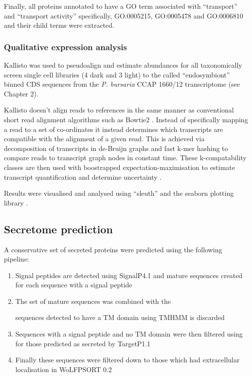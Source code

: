 {{Finally, all proteins annotated to have a GO term associated with ``transport'' and
``transport activity'' specifically, GO:0005215, GO:0005478 and GO:0006810 and their child
terms were extracted.  

\subsubsection{Qualitative expression analysis}

Kallisto \citep{Bray2015} was used to pseudoalign and estimate abundances for 
all taxonomically screen single cell 
libraries (4 dark and 3 light) to the called ``endosymbiont''
binned CDS sequences from the \textit{P. bursaria} CCAP 1660/12
transcriptome (see Chapter 2).

Kallisto doesn't align reads to references in the same
manner as conventional short read alignment algorithms
such as Bowtie2 \citep{Langmead2012}.  Instead of specifically 
mapping a read to a set of co-ordinates it instead
determines which transcripts are compatible with the alignment 
of a given read.  This is achieved via decomposition of transcripts
in de-Bruijn graphs and fast k-mer hashing to compare reads to transcript
graph nodes in constant time.  These k-compatability classes are then used with
boostrapped expectation-maximisation to estimate transcript quantification and
determine uncertainty \citep{Bray2015}. 

Results were visualised and analysed using ``sleuth'' and the
seaborn plotting library \citep{michael_waskom_2015_19108}.

\subsection{Secretome prediction}

A conservative set of secreted proteins were predicted 
using the following pipeline:
\begin{enumerate}
    \item Signal peptides are detected using SignalP4.1 and mature sequences
        created for each sequence with a signal peptide
    \item The set of mature sequences was combined with the 
        
        
        sequences detected to have a TM domain using TMHMM is discarded
    \item Sequences with a signal peptide and no TM domain were then filtered
        using for those predicted as secreted by TargetP1.1 
    \item Finally these sequences were filtered down to those which had extracellular
        localisation in WoLFPSORT 0.2 
\end{enumerate}

}}
